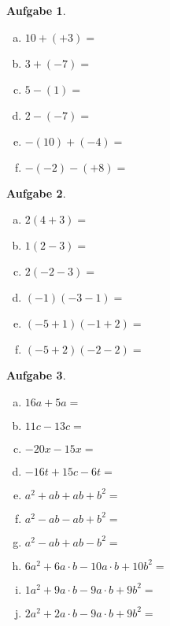 \documentclass[12pt,fleqn]{article}
\theoremstyle{aufg}
\newtheorem{aufgabe}{Aufgabe}
\theoremstyle{bsp}
\begin{document}
 
    \begin{flushleft}
\begin{center}\end{center}\begin{aufgabe} ~ \\ 
\begin{multicols}{3} 
\begin{enumerate}[a)] 
\item 
$10+(+3)=$
\item 
$3+(-7)=$
\item 
$5-(1)=$
\item 
$2-(-7)=$
\item 
$-(10)+(-4)=$
\item 
$-(-2)-(+8)=$
\end{enumerate} 
\end{multicols} 
\end{aufgabe} 
\begin{aufgabe} ~ \\ 
\begin{multicols}{3} 
\begin{enumerate}[a)] 
\item 
$2(4+3)=$
\item 
$1(2-3)=$
\item 
$2(-2-3)=$
\item 
$(-1)(-3-1)=$
\item 
$(-5+1)(-1+2)=$
\item 
$(-5+2)(-2-2)=$
\end{enumerate} 
\end{multicols} 
\end{aufgabe} 
\begin{aufgabe} ~ \\ 
\begin{multicols}{2} 
\begin{enumerate}[a)] 
\item 
$16a+5a=$
\item 
$11c-13c=$
\item 
$-20x-15x=$
\item 
$-16t+15c-6t=$
\item 
$a^2+ab+ab+b^2=$
\item 
$a^2-ab-ab+b^2=$
\item 
$a^2-ab+ab-b^2=$
\item 
$6a^2+6a\cdot b-10a\cdot b+10b^2=$
\item 
$1a^2+9a\cdot b-9a\cdot b+9b^2=$
\item 
$2a^2+2a\cdot b-9a\cdot b+9b^2=$
\end{enumerate} 

\end{multicols}
\end{aufgabe}
\end{flushleft}
\end{document}

